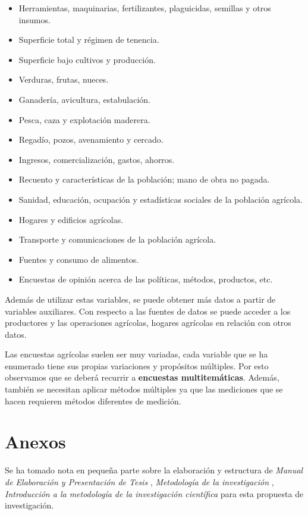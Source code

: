 \documentclass{report}
\begin{document}
\begin{itemize}
    \item Herramientas, maquinarias, fertilizantes, plaguicidas, semillas y otros insumos.
    \item Superficie total y régimen de tenencia.
    \item Superficie bajo cultivos y producción.
    \item Verduras, frutas, nueces.
    \item Ganadería, avicultura, estabulación.
    
    \item Pesca, caza y explotación maderera.
    \item Regadío, pozos, avenamiento y cercado.
    \item Ingresos, comercialización, gastos, ahorros.
    \item Recuento y características de la población; mano de obra no pagada.
    \item Sanidad, educación, ocupación y estadísticas sociales de la población agrícola.
    \item Hogares y edificios agrícolas.
    \item Transporte y comunicaciones de la población agrícola.
    \item Fuentes y consumo de alimentos.
    \item Encuestas de opinión acerca de las políticas, métodos, productos, etc.
\end{itemize}

\bigbreak
    
Además de utilizar estas variables, se puede obtener más datos a partir de variables auxiliares. Con respecto a las fuentes de datos se puede acceder a los productores y las operaciones agrícolas, hogares agrícolas en relación con otros datos.

\bigbreak

Las encuestas agrícolas suelen ser muy variadas, cada variable que se ha enumerado tiene sus propias variaciones y propósitos múltiples. Por esto observamos que se deberá recurrir a \textbf{encuestas multitemáticas}. Además, también se necesitan aplicar métodos múltiples ya que las mediciones que se hacen requieren métodos diferentes de medición.
    
\section{Anexos}

Se ha tomado nota en pequeña parte sobre la elaboración y estructura de \textit{Manual de Elaboración y Presentación de Tesis} \cite{universidad-san-carlos-2016}, \textit{Metodología de la investigación} \cite{collado-2014}, \textit{Introducción a la metodología de la investigación científica} \cite{cabezas-2018} para esta propuesta de investigación.
\end{document}

